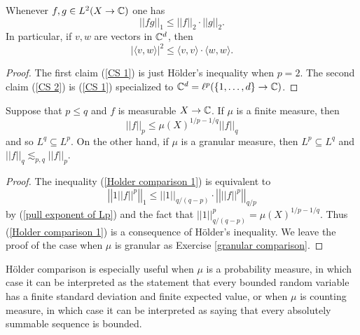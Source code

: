 \begin{corollary}
Whenever $f, g \in L^2(X \to \mathbb{C})$ one has
\begin{equation}
\label{CS 1}
||fg||_1 \leq ||f||_2 \cdot ||g||_2.
\end{equation}
In particular, if $v, w$ are vectors in $\mathbb{C}^d$, then
\begin{equation}
\label{CS 2}
|\langle v, w\rangle|^2 \leq \langle v, v\rangle \cdot \langle w, w\rangle.
\end{equation}
\end{corollary}
\begin{proof}
The first claim (\ref{CS 1}) is just H\"older's inequality when $p = 2$.
The second claim (\ref{CS 2}) is (\ref{CS 1}) specialized to $\mathbb{C}^{d} = \ell^p(\{1, \dots, d\} \to \mathbb{C})$.
\end{proof}

\begin{corollary}
\label{Holder comparison}
Suppose that $p \leq q$ and $f$ is measurable $X \to \mathbb{C}$.
If $\mu$ is a finite measure, then
\begin{equation}
\label{Holder comparison 1}
||f||_{p}  \leq \mu(X)^{1/p-1/q} ||f||_q
\end{equation}
and so $L^{q} \subseteq L^p$.
On the other hand, if $\mu$ is a granular measure, then $L^{p} \subseteq L^q$ and $||f||_{q} \lesssim_{p,q} ||f||_{p} $.
\end{corollary}
\begin{proof}
The inequality (\ref{Holder comparison 1}) is equivalent to
\[\left|\left|1 ||f||^p\right|\right|_1 \leq ||1||_{q/(q-p)} \cdot \left|\left| ||f||^p\right|\right|_{q/p}\]
by (\ref{pull exponent of Lp}) and the fact that $||1||_{q/(q-p)}^{p} = \mu(X)^{1/p-1/q}$.
Thus (\ref{Holder comparison 1}) is a consequence of H\"older's inequality.
We leave the proof of the case when $\mu$ is granular as Exercise \ref{granular comparison}.
\end{proof}

H\"older comparison is especially useful when $\mu$ is a probability measure, in which case it can be interpreted as the statement that every bounded random variable has a finite standard deviation and finite expected value, or when $\mu$ is counting measure, in which case it can be interpreted as saying that every absolutely summable sequence is bounded.


